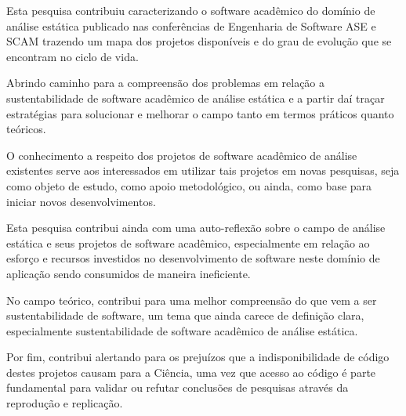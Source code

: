 Esta pesquisa contribuiu caracterizando o software acadêmico do domínio de
análise estática publicado nas conferências de Engenharia de Software ASE e
SCAM trazendo um mapa dos projetos disponíveis e do grau de evolução que
se encontram no ciclo de vida.

Abrindo caminho para a compreensão dos problemas em relação a sustentabilidade de
software acadêmico de análise estática e a partir daí traçar estratégias para
solucionar e melhorar o campo tanto em termos práticos quanto teóricos.

O conhecimento a respeito dos projetos de software acadêmico de análise
existentes serve aos interessados em utilizar tais projetos em novas pesquisas,
seja como objeto de estudo, como apoio metodológico, ou ainda, como base para
iniciar novos desenvolvimentos.


Esta pesquisa contribui ainda com uma auto-reflexão sobre o campo de análise
estática e seus projetos de software acadêmico, especialmente em relação ao
esforço e recursos investidos no desenvolvimento de software neste domínio de
aplicação sendo consumidos de maneira ineficiente.


No campo teórico, contribui para uma melhor compreensão do que vem a ser
sustentabilidade de software, um tema que ainda carece de definição clara,
especialmente sustentabilidade de software acadêmico de análise estática.


Por fim, contribui alertando para os prejuízos que a indisponibilidade de
código destes projetos causam para a Ciência, uma vez que acesso ao código é
parte fundamental para validar ou refutar conclusões de pesquisas através da
reprodução e replicação.



